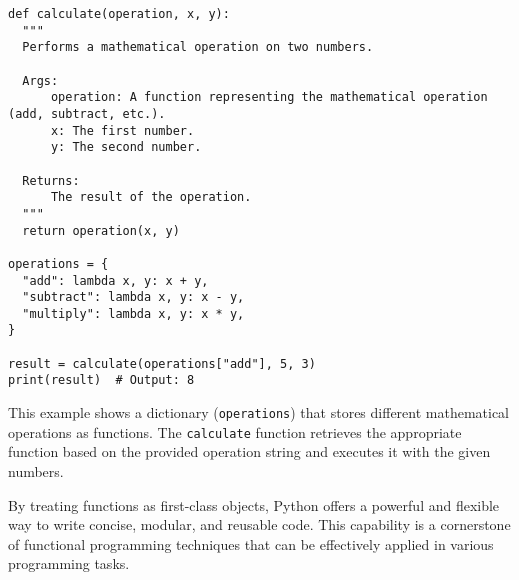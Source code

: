\begin{lstlisting}[style=mystyle]
def calculate(operation, x, y):
  """
  Performs a mathematical operation on two numbers.

  Args:
      operation: A function representing the mathematical operation (add, subtract, etc.).
      x: The first number.
      y: The second number.

  Returns:
      The result of the operation.
  """
  return operation(x, y)

operations = {
  "add": lambda x, y: x + y,
  "subtract": lambda x, y: x - y,
  "multiply": lambda x, y: x * y,
}

result = calculate(operations["add"], 5, 3)
print(result)  # Output: 8
\end{lstlisting}

This example shows a dictionary (\texttt{operations}) that stores different mathematical operations as functions. The \texttt{calculate} function retrieves the appropriate function based on the provided operation string and executes it with the given numbers.

By treating functions as first-class objects, Python offers a powerful and flexible way to write concise, modular, and reusable code. This capability is a cornerstone of functional programming techniques that can be effectively applied in various programming tasks.
